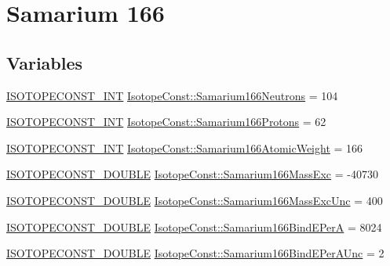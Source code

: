 \hypertarget{group___isotope_const-_samarium-_sm166}{}\section{Samarium 166}
\label{group___isotope_const-_samarium-_sm166}
\subsection*{Variables}
\begin{DoxyCompactItemize}
\item 
\mbox{\hyperlink{group___isotope_const-_macros_ga5f18360b3e99483a35c32d789e62621c}{I\+S\+O\+T\+O\+P\+E\+C\+O\+N\+S\+T\+\_\+\+I\+NT}} \mbox{\hyperlink{group___isotope_const-_samarium-_sm166_ga502357ea3f084730e98b2712992e9924}{Isotope\+Const\+::\+Samarium166\+Neutrons}} = 104
\item 
\mbox{\hyperlink{group___isotope_const-_macros_ga5f18360b3e99483a35c32d789e62621c}{I\+S\+O\+T\+O\+P\+E\+C\+O\+N\+S\+T\+\_\+\+I\+NT}} \mbox{\hyperlink{group___isotope_const-_samarium-_sm166_gab59256aba152d87b7b8c732ebb6dcf47}{Isotope\+Const\+::\+Samarium166\+Protons}} = 62
\item 
\mbox{\hyperlink{group___isotope_const-_macros_ga5f18360b3e99483a35c32d789e62621c}{I\+S\+O\+T\+O\+P\+E\+C\+O\+N\+S\+T\+\_\+\+I\+NT}} \mbox{\hyperlink{group___isotope_const-_samarium-_sm166_ga147a252f4c63497b38e008f636d8f386}{Isotope\+Const\+::\+Samarium166\+Atomic\+Weight}} = 166
\item 
\mbox{\hyperlink{group___isotope_const-_macros_ga8f45a7272ce02c0b4c65c44636ed719a}{I\+S\+O\+T\+O\+P\+E\+C\+O\+N\+S\+T\+\_\+\+D\+O\+U\+B\+LE}} \mbox{\hyperlink{group___isotope_const-_samarium-_sm166_gae61fbe7ba370679e195bf7695df8b0f6}{Isotope\+Const\+::\+Samarium166\+Mass\+Exc}} = -\/40730
\item 
\mbox{\hyperlink{group___isotope_const-_macros_ga8f45a7272ce02c0b4c65c44636ed719a}{I\+S\+O\+T\+O\+P\+E\+C\+O\+N\+S\+T\+\_\+\+D\+O\+U\+B\+LE}} \mbox{\hyperlink{group___isotope_const-_samarium-_sm166_ga6b8a1471ba89d9892bb6bde036c02f73}{Isotope\+Const\+::\+Samarium166\+Mass\+Exc\+Unc}} = 400
\item 
\mbox{\hyperlink{group___isotope_const-_macros_ga8f45a7272ce02c0b4c65c44636ed719a}{I\+S\+O\+T\+O\+P\+E\+C\+O\+N\+S\+T\+\_\+\+D\+O\+U\+B\+LE}} \mbox{\hyperlink{group___isotope_const-_samarium-_sm166_ga3ee4cf6b793cbd41607fa69b226ca536}{Isotope\+Const\+::\+Samarium166\+Bind\+E\+PerA}} = 8024
\item 
\mbox{\hyperlink{group___isotope_const-_macros_ga8f45a7272ce02c0b4c65c44636ed719a}{I\+S\+O\+T\+O\+P\+E\+C\+O\+N\+S\+T\+\_\+\+D\+O\+U\+B\+LE}} \mbox{\hyperlink{group___isotope_const-_samarium-_sm166_ga89797ca34e4f584949ab3b3a8a6faba0}{Isotope\+Const\+::\+Samarium166\+Bind\+E\+Per\+A\+Unc}} = 2

\end{DoxyCompactItemize}
